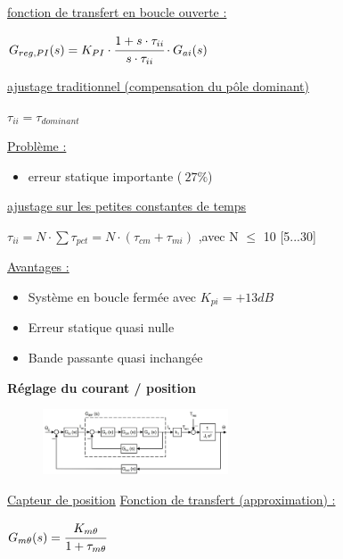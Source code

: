 \documentclass[	DIV=calc,%
							paper=a4,%
							fontsize=10pt,%
							twocolumn]{scrartcl} %
\newcounter{mycounter}
\newcommand{\formdesc}[1]{\noindent\textbf{#1} \addtocounter{mycounter}{1} \hfill \themycounter}
\newcommand{\formtitle}[1]{\noindent\underline{#1}}
\begin{document}
\formtitle{fonction de transfert en boucle ouverte : }

\vspace{3mm}

{\footnotesize $G_{reg,{PI}}(s) =  K_{PI} \cdot \cfrac{1+s\cdot\tau_{ii}}{s\cdot\tau_{ii}} \cdot G_{ai}(s) $}
\vspace{3mm}

\formtitle{ ajustage traditionnel (compensation du pôle dominant)}

\vspace{3mm}
$\tau_{ii} = \tau_{dominant}$
\vspace{3mm}

\underline{Problème :}
\begin{itemize}
    \item  erreur statique importante ($~27\%$)
\end{itemize}

\formtitle{ ajustage sur les petites constantes de temps}

\vspace{3mm}
$\tau_{ii} = N \cdot \sum\tau_{pct} = N \cdot (\tau_{cm}+ \tau_{mi})$ ,avec N $\leq$ 10 [5...30]

\underline{Avantages :}
\begin{itemize}
    \item Système en boucle fermée avec $K_{pi} = +13 dB$
    \item Erreur statique quasi nulle
    \item Bande passante quasi inchangée
\end{itemize}


\formdesc{Réglage du courant / position}
\begin{figure}[H]
    \begin{center}
        \includegraphics[width = 0.49\textwidth]{img/Regulation_courrant_pos.JPG}
    \end{center}
\end{figure}

\formtitle{Capteur de position}
\underline{Fonction de transfert (approximation) :}

\vspace{3mm}
$G_{m\theta}(s) = \cfrac{K_{m\theta}}{1+\tau_{m\theta}} $
\end{document}
